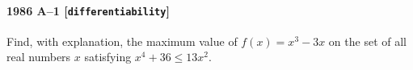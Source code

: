 \paragraph{1986 A--1 \textnormal{[\texttt{differentiability}]}}
Find, with explanation, the maximum value of $f(x)=x^3-3x$ on the
set of all real numbers $x$ satisfying $x^4+36\leq 13x^2$.
